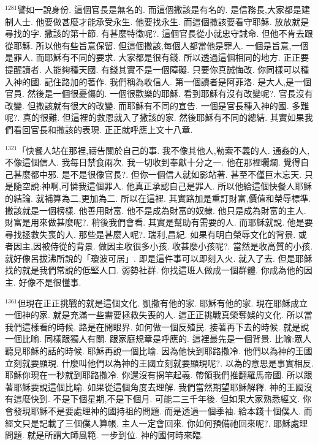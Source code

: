 \documentclass{book}
\begin{document}
$^{1281}$譬如一說身份.
這個官長是無名的.
而這個撒該是有名的.
是信務長,大家都是建制人士.
他要做甚麼才能承受永生.
他要找永生.
而這個撒該要看守耶穌.
放放就是尋找的字.
撒該的第十節.
有甚麼特徵呢?.
這個官長從小就忠守誡命.
但他不肯去跟從耶穌.
所以他有些旨意保留.
但這個撒該,每個人都當他是罪人.
一個是旨意,一個是罪人.
而耶穌有不同的要求.
大家都是很有錢.
所以透過這個相同的地方.
正正要提醒讀者.
人能夠種天國.
有錢其實不是一個障礙.
只要你真誠悔改.
你同樣可以種入神的國.
記住路加的著作.
我們稱為收信人.
第一個讀者是阿菲洛.
是大人,是一個官員.
然後是一個很憂傷的.
一個很歡樂的耶穌.
看到耶穌有沒有改變呢?.
官長沒有改變.
但撒該就有很大的改變.
而耶穌有不同的宣告.
一個是官長種入神的國.
多難呢?.
真的很難.
但這裡的救恩就入了撒該的家.
然後耶穌有不同的總結.
其實如果我們看回官長和撒該的表現.
正正就呼應上文十八章.

$^{1321}$「快餐人站在那裡,禱告關於自己的事.
我不像其他人,勒索不義的人.
通姦的人,不像這個信人.
我每日禁食兩次.
我一切收到奉獻十分之一.
他在那裡曬爛.
覺得自己甚麼都中邪.
是不是很像官長?.
但你一個信人就如影站著.
甚至不僅巨木忘天.
只是隨空說:神啊,可憐我這個罪人.
他真正承認自己是罪人.
所以他給這個快餐人耶穌的結論.
就補算為二,更加為二.
所以在這裡.
其實路加是重訂財富,價值和榮辱標準.
撒該就是一個榜樣.
他善用財富.
他不是成為財富的奴隸.
他只是成為財富的主人.
財富是用來做甚麼呢?.
稍後我們會看.
其實是幫助有需要的人.
而耶穌就說.
他是要尋找拯救失喪的人.
那些是甚麼人呢?.
瑞利,昌紀.
如果有明白榮辱文化的背景.
或者因主,因被侍從的背景.
做因主收很多小孩.
收甚麼小孩呢?.
當然是收高質的小孩.
就好像呂拔沸所說的「瓊波可居」.
即是這件事可以即刻入火.
就入了去.
但是耶穌找的就是我們常說的低堅人口.
弱勢社群.
你找這班人做成一個群體.
你成為他的因主.
好像不是很懂事.

$^{1361}$但現在正正挑戰的就是這個文化.
凱撒有他的家.
耶穌有他的家.
現在耶穌成立一個神的家.
就是充滿一些需要拯救失喪的人.
這正正挑戰真榮奪娛的文化.
所以當我們這樣看的時候.
路是在開眼界.
如何做一個反殖民.
接著再下去的時候.
就是說一個比喻.
同樣跟獨人有關.
跟家庭規章是呼應的.
這裡最先是一個背景.
比喻:眾人聽見耶穌的話的時候.
耶穌再說一個比喻.
因為他快到耶路撒冷.
他們以為神的王國立刻就要顯現.
什麼叫他們以為神的王國立刻就要顯現呢?.
以為的意思是事實相反.
耶穌你現在一秒就到耶路撒冷.
你還沒有揭竿起義.
帶領我們推翻羅馬帝國.
所以跟著耶穌要說這個比喻.
如果從這個角度去理解.
我們當然期望耶穌解釋.
神的王國沒有這麼快到.
不是下個星期,不是下個月.
可能二三千年後.
但如果大家熟悉經文.
你會發現耶穌不是要處理神的國持祖的問題.
而是透過一個季袖.
給本錢十個僕人.
而經文只是記載了三個僕人算帳.
主人一定會回來.
你如何預備祂回來呢?.
耶穌處理問題.
就是所謂大師風範.
一步到位.
神的國何時來臨.
\end{document}
